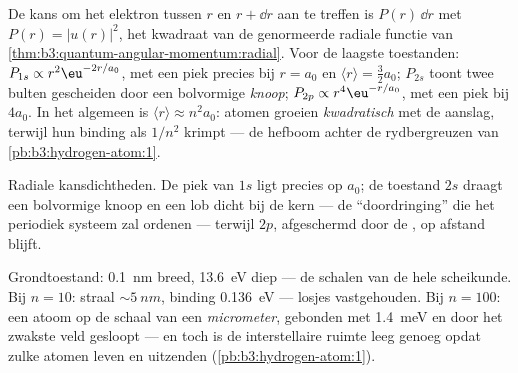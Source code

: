 \begin{proposition}\label{prop:b3:hydrogen-atom:radial}
De kans om het elektron tussen $r$ en $r + \dd r$ aan te treffen is
$P(r)\,\dd r$ met $P(r) = |u(r)|^2$, het kwadraat van de genormeerde
radiale functie van \cref{thm:b3:quantum-angular-momentum:radial}. Voor de laagste toestanden:
$P_{1s} \propto r^2\eu^{-2r/a_0}$, met een piek precies bij $r = a_0$ en
$\langle r\rangle = \tfrac32 a_0$; $P_{2s}$ toont twee bulten gescheiden
door een bolvormige \emph{knoop}; $P_{2p} \propto
r^4\eu^{-r/a_0}$, met
een piek bij $4a_0$. In het algemeen is $\langle r\rangle
\approx n^2a_0$:
atomen groeien \emph{kwadratisch} met de aanslag, terwijl hun binding als
$1/n^2$ krimpt --- de hefboom achter de rydbergreuzen van
\cref{pb:b3:hydrogen-atom:1}.
\end{proposition}
\admitted

\begin{omfigure}

{\small Radiale kansdichtheden. De piek van $1s$ ligt precies op $a_0$;
de toestand $2s$ draagt een bolvormige knoop en een lob dicht bij de kern
--- de ``doordringing'' die het periodiek systeem zal ordenen --- terwijl
$2p$, afgeschermd door de , op afstand blijft.}
\end{omfigure}

\begin{example}\label{ex:b3:hydrogen-atom:sizes}
Grondtoestand: \qty{0.1}{nm} breed, \qty{13.6}{eV} diep --- de schalen van
de hele scheikunde. Bij $n = 10$: straal $\sim\qty{5}{nm}$, binding
\qty{0.136}{eV} --- losjes vastgehouden. Bij $n = 100$: een atoom op de
schaal van een \emph{micrometer}, gebonden met \qty{1.4}{meV} en door het
zwakste veld gesloopt --- en toch is de interstellaire ruimte leeg genoeg
opdat zulke atomen leven en uitzenden
(\cref{pb:b3:hydrogen-atom:1}).
\end{example}

